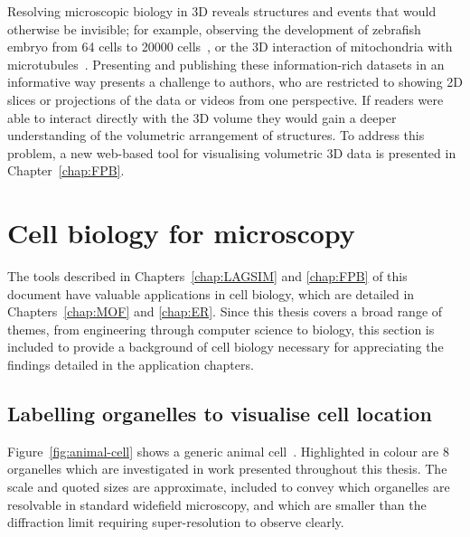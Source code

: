 Resolving microscopic biology in 3D reveals structures and events that would otherwise be invisible; for example, observing the development of zebrafish embryo from 64 cells to \num{20000} cells~\cite{keller2008reconstruction}, or the 3D interaction of mitochondria with microtubules~\cite{huang2016ultra}. 
Presenting and publishing these information-rich datasets in an informative way presents a challenge to authors, who are restricted to showing 2D slices or projections of the data or videos from one perspective. 
If readers were able to interact directly with the 3D volume they  would gain a deeper understanding of the volumetric arrangement of structures. 
To address this problem, a new web-based tool for visualising volumetric 3D data is presented in Chapter~\ref{chap:FPB}. 


\section{Cell biology for microscopy}
The tools described in Chapters~\ref{chap:LAGSIM} and \ref{chap:FPB} of this document have valuable applications in cell biology, which are detailed in Chapters~\ref{chap:MOF} and \ref{chap:ER}.
Since this thesis covers a broad range of themes, from engineering through computer science to biology, this section is included to provide a background of cell biology necessary for appreciating the findings detailed in the application chapters. 

\subsection{Labelling organelles to visualise cell location}
Figure~\ref{fig:animal-cell} shows a generic animal cell~\cite{wikicell}. 
Highlighted in colour are 8 organelles which are investigated in work presented throughout this thesis. 
The scale and quoted sizes are approximate, included to convey which organelles are resolvable in standard widefield microscopy, and which are smaller than the diffraction limit requiring super-resolution to observe clearly. 

